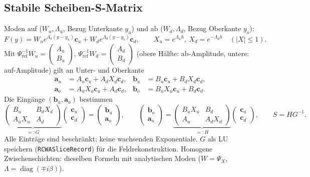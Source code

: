 \subsection{Stabile Scheiben-S-Matrix}
Moden auf ($W_u,\Lambda_u$, Bezug Unterkante $y_u$) und ab ($W_d,\Lambda_d$, Bezug Oberkante $y_o$):
\begin{equation}
  F(y)=W_ue^{\Lambda_u(y-y_u)}\mathbf c_u+W_de^{\Lambda_d(y-y_o)}\mathbf c_d,\qquad
  X_u=e^{\Lambda_uh},\ X_d=e^{-\Lambda_dh}\quad(|X|\le1).
  \label{eq:rcwa_field}
\end{equation}
Mit $\Psi_{\text{ref}}^{-1}W_u=\begin{pmatrix}A_u\\B_u\end{pmatrix}$, $\Psi_{\text{ref}}^{-1}W_d=\begin{pmatrix}A_d\\B_d\end{pmatrix}$
(obere Hälfte: ab-Amplitude, untere: auf-Amplitude) gilt an Unter- und Oberkante
\begin{equation}
  \begin{aligned}
  \mathbf a_u&=A_u\mathbf c_u+A_dX_d\mathbf c_d, & \mathbf b_u&=B_u\mathbf c_u+B_dX_d\mathbf c_d,\\
  \mathbf a_o&=A_uX_u\mathbf c_u+A_d\mathbf c_d, & \mathbf b_o&=B_uX_u\mathbf c_u+B_d\mathbf c_d .
  \end{aligned}
  \label{eq:rcwa_bc}
\end{equation}
Die Eingänge $(\mathbf b_u,\mathbf a_o)$ bestimmen
\begin{equation}
  \underbrace{\begin{pmatrix}B_u&B_dX_d\\A_uX_u&A_d\end{pmatrix}}_{=:G}\begin{pmatrix}\mathbf c_u\\\mathbf c_d\end{pmatrix}=
  \begin{pmatrix}\mathbf b_u\\\mathbf a_o\end{pmatrix},\qquad
  \begin{pmatrix}\mathbf b_o\\\mathbf a_u\end{pmatrix}=
  \underbrace{\begin{pmatrix}B_uX_u&B_d\\A_u&A_dX_d\end{pmatrix}}_{=:H}\begin{pmatrix}\mathbf c_u\\\mathbf c_d\end{pmatrix},
  \qquad S=HG^{-1}.
  \label{eq:rcwa_S}
\end{equation}
Alle Einträge sind beschränkt; keine wachsenden Exponentiale. $G$ als LU speichern
(\verb|RCWASliceRecord|) für die Feldrekonstruktion. Homogene Zwischenschichten: dieselben Formeln mit
analytischen Moden ($W=\Psi_X$, $\Lambda=\operatorname{diag}(\mp i\beta)$).

